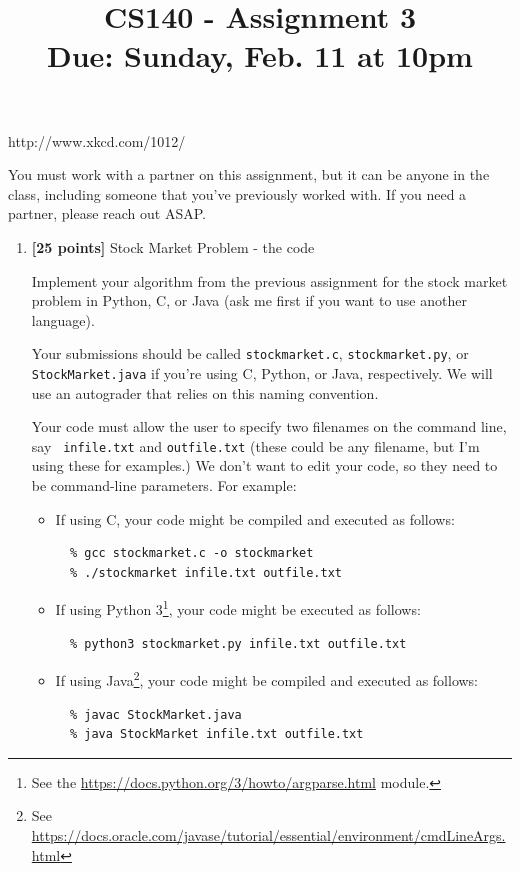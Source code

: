 \documentclass[11pt]{article}
\title{CS140 - Assignment 3\\\small{Due: Sunday,  Feb. 11 at 10pm}}
\author{}
\date{}
\begin{document}
\maketitle

\begin{center}

\footnotesize{http://www.xkcd.com/1012/}
\end{center}

\noindent You must work with a partner on this assignment, but it can be anyone in the class, including someone that you've previously worked with.  If you need a partner, please reach out ASAP.

\begin{enumerate}

\item \textbf{[25 points]} Stock Market Problem - the code

Implement your algorithm from the previous assignment for the stock market problem in Python, C, or
  Java (ask me first if you want to use another language).
  
  Your submissions should be called \texttt{stockmarket.c}, \texttt{stockmarket.py}, or \texttt{StockMarket.java} if you're using C, Python, or Java, respectively.  We will use an autograder that relies on this naming convention.
  
  Your code must allow the user to specify two filenames on the command line, say {\tt
    infile.txt} and {\tt outfile.txt} (these could be any filename, but I'm using these for examples.)  We don't
  want to edit your code, so they need to be command-line parameters.  For example:
  \begin{itemize}
  \item If using C, your code might be compiled and executed as follows:
\begin{verbatim}
  % gcc stockmarket.c -o stockmarket
  % ./stockmarket infile.txt outfile.txt
\end{verbatim}
\item If using Python 3\footnote{See the
  \url{https://docs.python.org/3/howto/argparse.html} module.}, your
  code might be executed as follows:
\begin{verbatim}
  % python3 stockmarket.py infile.txt outfile.txt
\end{verbatim}
\item If using Java\footnote{See \url{https://docs.oracle.com/javase/tutorial/essential/environment/cmdLineArgs.html}}, your code might be compiled and
  executed as follows:
\begin{verbatim}
  % javac StockMarket.java
  % java StockMarket infile.txt outfile.txt
\end{verbatim}
  \end{itemize}
    

\end{enumerate}
\end{document}
